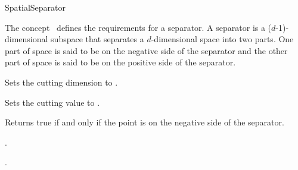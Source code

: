 

\begin{ccRefConcept}{SpatialSeparator}


\ccDefinition
  
The concept \ccRefName\ defines the requirements for a separator.
A separator is a ($d$-1)-dimensional subspace that separates a $d$-dimensional space into two parts.
One part of space is said to be on the negative side of the separator and the other part of space is 
said to be on the positive side of the separator.

\ccTypes


\ccCreation
{}  %


\ccOperations

{Sets the cutting dimension to . }

{Sets the cutting value to . }





{Returns true if and only if the point  is on the negative side of the separator.}


\ccHasModels

.

\ccSeeAlso

.

\end{ccRefConcept}



